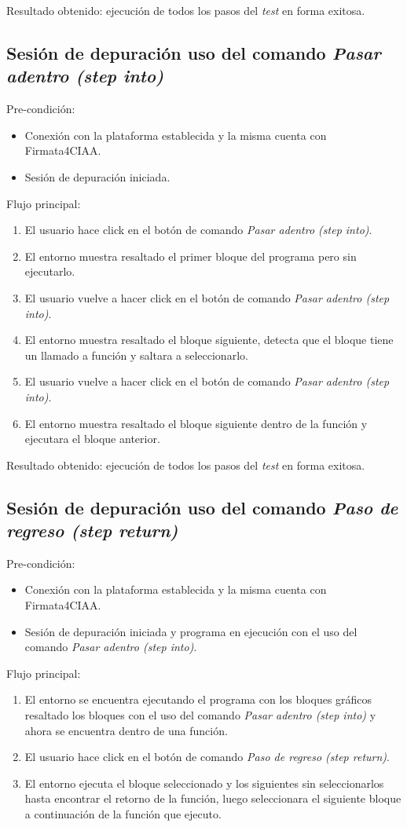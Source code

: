 Resultado obtenido: ejecución de todos los pasos del \emph{test} en forma exitosa.  

\subsection{Sesión de depuración uso del comando \emph{Pasar adentro (step into)}}
Pre-condición:
\begin{itemize}
	\item Conexión con la plataforma establecida y la misma cuenta con Firmata4CIAA.
	\item Sesión de depuración iniciada. 
\end{itemize}

Flujo principal:
\begin{enumerate}
	\item
	El usuario hace click en el botón de comando \emph{Pasar adentro (step into)}.
	\item
	El entorno muestra resaltado el primer bloque del programa pero sin ejecutarlo.
	\item
	El usuario vuelve a hacer click en el botón de comando \emph{Pasar adentro (step into)}.
	\item
	El entorno muestra resaltado el bloque siguiente, detecta que el bloque tiene un llamado a función y saltara a seleccionarlo. 
	\item
	El usuario vuelve a hacer click en el botón de comando \emph{Pasar adentro (step into)}.
	\item
	El entorno muestra resaltado el bloque siguiente dentro de la función y ejecutara el bloque anterior. 
\end{enumerate}

Resultado obtenido: ejecución de todos los pasos del \emph{test} en forma exitosa.  

\subsection{Sesión de depuración uso del comando \emph{Paso de regreso (step return)}}
Pre-condición:
\begin{itemize}
	\item Conexión con la plataforma establecida y la misma cuenta con Firmata4CIAA.
	\item Sesión de depuración iniciada y programa en ejecución con el uso del comando \emph{Pasar adentro (step into)}.
\end{itemize}

Flujo principal:
\begin{enumerate}
	\item
	El entorno se encuentra ejecutando el programa con los bloques gráficos resaltado los bloques con el uso del comando \emph{Pasar adentro (step into)} y ahora se encuentra dentro de una función.
	\item
	El usuario hace click en el botón de comando \emph{Paso de regreso (step return)}.
	\item
	El entorno ejecuta el bloque seleccionado y los siguientes sin seleccionarlos hasta encontrar el retorno de la función, luego seleccionara el siguiente bloque a continuación de la función que ejecuto.
\end{enumerate}

